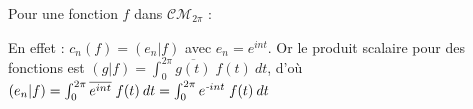 \documentclass[11pt,a4paper,fleqn,pdftex]{report}
\begin{document}
\begin{dfn}
Pour une fonction $f$ dans $\mathcal{CM}_{2\pi}$ :\\
\begin{center}
 \end{center}

En effet : $c_n(f) = (e_n | f)$ avec $e_n = e^{int}$. Or le produit scalaire pour des fonctions est $(g|f)=\int_0^{2\pi} \overline{g(t)}\; f(t) \: dt$, d'où $(e_n|f)=\int_0^{2\pi} \overline{e^{int}}\; f(t) \: dt=\int_0^{2\pi} e^{\emph{-}int}\; f(t) \: dt$
\end{dfn}
\end{document}
